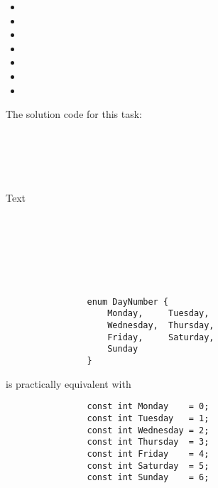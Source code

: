 \documentclass{report}
\begin{document}
		\begin{itemize}
			\item 
			\item 
			\item 
			\item 
			\item 
			\item 
			\item 
		\end{itemize}
		
		
		\begin{minipage}{\linewidth}
			The solution code for this task:
			\begin{lstlisting}
			
			\end{lstlisting}
		\end{minipage}
		\\ \\
		
		
		\begin{minipage}{\linewidth}
			Text
			\begin{lstlisting}
				
			\end{lstlisting}
		\end{minipage}
		\\ \\
		
		
		
		\begin{minipage}{0.95\linewidth}
			\begin{center}
				\begin{lstlisting}
				
				\end{lstlisting}
			\end{center}
		\end{minipage}
		
		\begin{minipage}{\linewidth}
			\begin{lstlisting}
				enum DayNumber {
					Monday, 	Tuesday,
					Wednesday, 	Thursday,
					Friday, 	Saturday,
					Sunday
				}
			\end{lstlisting}
		\end{minipage}
		
		is practically equivalent with
		
		\begin{minipage}{\linewidth}
			\begin{lstlisting}
				const int Monday	= 0;
				const int Tuesday	= 1;
				const int Wednesday	= 2;
				const int Thursday	= 3;
				const int Friday	= 4;
				const int Saturday	= 5;
				const int Sunday	= 6;
			\end{lstlisting}
		\end{minipage}
		\fi
\end{document}

